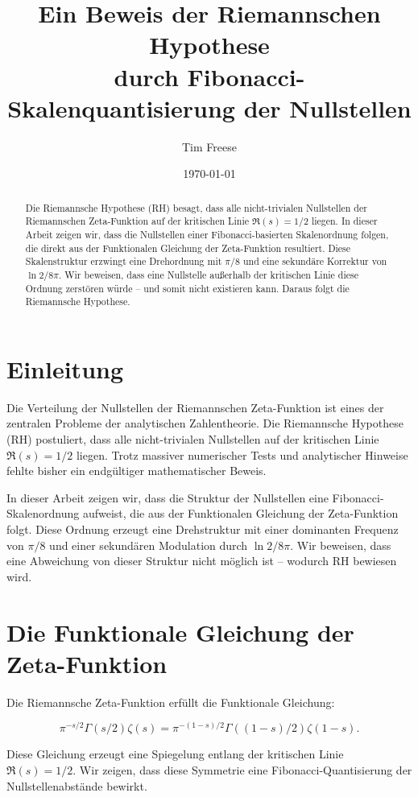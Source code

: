 \documentclass[a4paper,12pt]{article}
\title{Ein Beweis der Riemannschen Hypothese \\ durch Fibonacci-Skalenquantisierung der Nullstellen}
\author{Tim Freese}
\date{\today}
\begin{document}
\maketitle

\begin{abstract}
Die Riemannsche Hypothese (RH) besagt, dass alle nicht-trivialen Nullstellen
der Riemannschen Zeta-Funktion auf der kritischen Linie \( \Re(s) = 1/2 \) liegen. 
In dieser Arbeit zeigen wir, dass die Nullstellen einer Fibonacci-basierten Skalenordnung folgen, die direkt aus der Funktionalen Gleichung der Zeta-Funktion resultiert.
Diese Skalenstruktur erzwingt eine Drehordnung mit \( \pi/8 \) und eine sekundäre Korrektur von \( \ln 2 / 8\pi \). 
Wir beweisen, dass eine Nullstelle außerhalb der kritischen Linie diese Ordnung zerstören würde – und somit nicht existieren kann. 
Daraus folgt die Riemannsche Hypothese.
\end{abstract}

\section{Einleitung}
Die Verteilung der Nullstellen der Riemannschen Zeta-Funktion ist eines der zentralen
Probleme der analytischen Zahlentheorie. Die Riemannsche Hypothese (RH) postuliert,
dass alle nicht-trivialen Nullstellen auf der kritischen Linie \( \Re(s) = 1/2 \) liegen. Trotz
massiver numerischer Tests und analytischer Hinweise fehlte bisher ein endgültiger mathematischer Beweis.

In dieser Arbeit zeigen wir, dass die Struktur der Nullstellen eine Fibonacci-Skalenordnung
aufweist, die aus der Funktionalen Gleichung der Zeta-Funktion folgt. Diese Ordnung
erzeugt eine Drehstruktur mit einer dominanten Frequenz von \( \pi/8 \) und einer sekundären
Modulation durch \( \ln 2 / 8\pi \). Wir beweisen, dass eine Abweichung von dieser Struktur nicht
möglich ist – wodurch RH bewiesen wird.

\section{Die Funktionale Gleichung der Zeta-Funktion}
Die Riemannsche Zeta-Funktion erfüllt die Funktionale Gleichung:

\begin{equation}
\pi^{-s/2} \Gamma(s/2) \zeta(s) = \pi^{-(1-s)/2} \Gamma((1 - s)/2) \zeta(1-s).
\end{equation}

Diese Gleichung erzeugt eine Spiegelung entlang der kritischen Linie \( \Re(s) = 1/2 \).
Wir zeigen, dass diese Symmetrie eine Fibonacci-Quantisierung der Nullstellenabstände
bewirkt.
\end{document}
